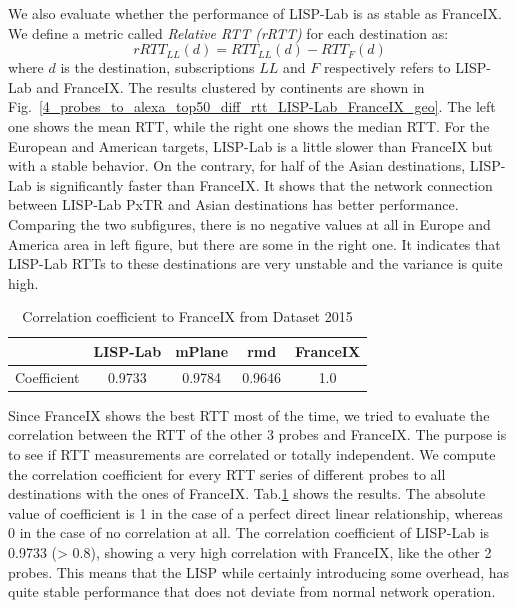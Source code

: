 We also evaluate whether the performance of LISP-Lab is as stable as FranceIX. %
We define a metric called \emph{Relative RTT (rRTT)} for each destination as: 
\begin{equation} 
    \label{rRTT_ll_2015}
    rRTT_{LL}(d)=RTT_{LL}(d) - RTT_{F}(d)
\end{equation}
where $d$ is the destination, subscriptions $LL$ and $F$ respectively refers to LISP-Lab and FranceIX. The results clustered by continents are shown in Fig.~\ref{4_probes_to_alexa_top50_diff_rtt_LISP-Lab_FranceIX_geo}. The left one shows the mean RTT, while the right one shows the median RTT. For the European and American targets, LISP-Lab is a little slower than FranceIX but with a stable behavior. On the contrary, for half of the Asian destinations, LISP-Lab is significantly faster than FranceIX. It shows that the network connection between LISP-Lab PxTR and Asian destinations has better performance. Comparing the two subfigures, there is no negative values at all in Europe and America area in left figure, but there are some in the right one. It indicates that LISP-Lab RTTs to these destinations are very unstable and the variance is quite high.

\begin{table}[!tb]
	\centering
	\caption{Correlation coefficient to FranceIX from Dataset 2015}
	\label{correlation_v4_2015}{
		\begin{tabular}{@{}c|c|c|c|c@{}}
			\hline\hline
			& LISP-Lab  & mPlane &  rmd &  FranceIX \\ \hline
			Coefficient & 0.9733  & 0.9784 &  0.9646  &  1.0     	\\  \hline\hline                 
		\end{tabular}
	}
\end{table}

Since FranceIX shows the best RTT most of the time, we tried to evaluate the correlation between the RTT of the other 3 probes and FranceIX. The purpose is to see if RTT measurements are correlated or totally independent. We compute the correlation coefficient for every RTT series of different probes to all destinations with the ones of FranceIX. Tab.\ref{correlation_v4_2015} shows the results. The absolute value of coefficient is 1 in the case of a perfect direct linear relationship, whereas 0 in the case of no correlation at all. The correlation coefficient of LISP-Lab is 0.9733 (> 0.8), showing a very high correlation with FranceIX, like the other 2 probes. This means that the LISP while certainly introducing some overhead, has quite stable performance that does not deviate from normal network operation.


